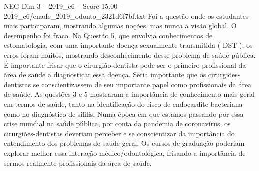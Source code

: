 \begin{textsample}{NEG Dim 3 – 2019\_c6 – Score 15.00 – 2019\_c6/enade\_2019\_odonto\_2321d6f7bf.txt}
Foi a questão onde os estudantes mais participaram, mostrando algumas noções, mas nunca a visão global.
O desempenho foi fraco.
Na Questão 5, que envolvia conhecimentos de estomatologia, com uma importante doença sexualmente transmitida ( DST ), os erros foram muitos, mostrando desconhecimento desse problema de saúde pública.
É importante frisar que o cirurgião-dentista pode ser o primeiro profissional da área de saúde a diagnosticar essa doença.
Seria importante que os cirurgiões-dentistas se conscientizassem de seu importante papel como profissionais da área de saúde.
As questões 3 e 5 mostraram a importância de conhecimento mais geral em termos de saúde, tanto na identificação do risco de endocardite bacteriana como no diagnóstico de sífilis.
Numa época em que estamos passando por essa crise mundial na saúde pública, por conta da pandemia de coronavírus, os cirurgiões-dentistas deveriam perceber e se conscientizar da importância do entendimento dos problemas de saúde geral.
Os cursos de graduação poderiam explorar melhor essa interação médico/odontológica, frisando a importância de sermos realmente profissionais da área de saúde.

\end{textsample}
